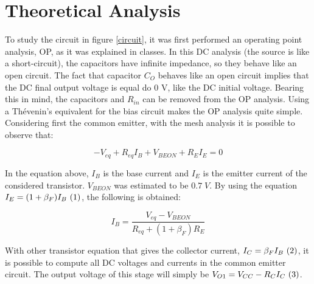 \newpage
\section{Theoretical Analysis}
\label{sec:analysis}


To study the circuit in figure \ref{circuit}, it was first performed an operating point analysis, OP, as it was explained in classes. In this DC analysis (the source is like a short-circuit), the capacitors have infinite impedance, so they behave like an open circuit. The fact that capacitor $C_O$ behaves like an open circuit implies that the DC final output voltage is equal do 0 V, like the DC initial voltage. Bearing this in mind, the capacitors and $R_{in}$ can be removed from the OP analysis. Using a Thévenin's equivalent for the bias circuit makes the OP analysis quite simple. Considering first the common emitter, with the mesh analysis it is possible to observe that:

\begin{equation}
        -V_{eq}+R_{eq}I_B+V_{BEON}+R_EI_E = 0
\end{equation}

In the equation above, $I_B$ is the base current and $I_E$ is the emitter current of the considered transistor. $V_{BEON}$ was estimated to be $0.7\;V$. By using the equation $I_E=(1+\beta_F)I_B ~\refstepcounter{equation}(\theequation) \label{fluxomagnetico}$, the following is obtained:

\begin{equation}
        I_B = \frac{V_{eq}-V_{BEON}}{R_{eq}+(1+\beta_F)R_E}
\end{equation}

With other transistor equation that gives the collector current, $I_C=\beta_FI_B ~\refstepcounter{equation}(\theequation) \label{fluxomagnetico}$, it is possible to compute all DC voltages and currents in the common emitter circuit. The output voltage of this stage will simply be $V_{O1} = V_{CC}-R_CI_C ~\refstepcounter{equation}(\theequation) \label{fluxomagnetico}$.

